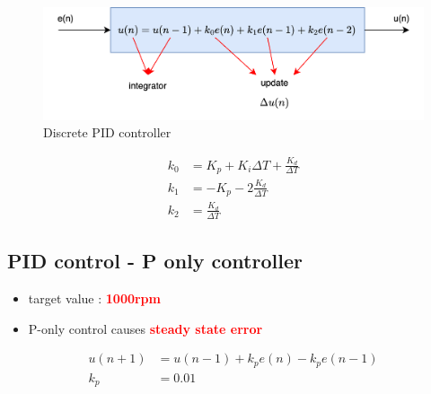 \documentclass[12pt,twoside,onecolumn,openany,extrafontsizes,dvipsnames]{memoir}
\begin{document}
            \begin{figure}[!htb]
                \centering
                \includegraphics[scale=0.8]{../diagrams/control_generic/control_generic-pid_discrete.png}
                \caption{Discrete PID controller }
                \label{fig:discrete_pid_controller}
            \end{figure}

            
            \begin{align}
                k_0 &= K_p + K_i\Delta T + \frac{K_d}{\Delta T} \\
                k_1 &= -K_p - 2\frac{K_d}{\Delta T} \nonumber \\
                k_2 &= \frac{K_d}{\Delta T} \nonumber
            \end{align}

                \newpage
                \subsection{PID control - P only controller}

                    \begin{itemize}
                        \item  target value : \textcolor{red}{\textbf { 1000rpm}}
                        \item  P-only control causes \textcolor{red}{\textbf {steady state error}}
                    \end{itemize}
                
                    \begin{align}
                        u(n+1) &= u(n-1) + k_pe(n) - k_pe(n-1) \\
                        k_p    &= 0.01 \nonumber
                    \end{align}
\end{document}
